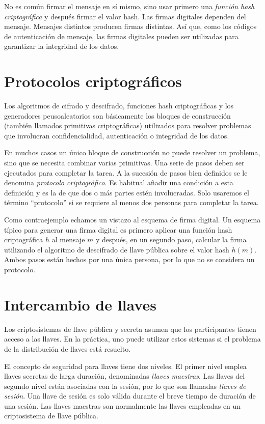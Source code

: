 \documentclass[12pt]{book}
\theoremstyle{definition}
\begin{document}
No es común firmar el mensaje en sí mismo, sino usar primero una \textit{función hash criptográfica} y después firmar el valor hash. Las firmas digitales dependen del mensaje. Mensajes distintos producen firmas distintas. Así que, como los códigos de autenticación de mensaje, las firmas digitales pueden ser utilizadas para garantizar la integridad de los datos.


\section{Protocolos criptográficos}

Los algoritmos de cifrado y descifrado, funciones hash criptográficas y los generadores peusoaleatorios son básicamente los bloques de construcción (también llamados primitivas criptográficas) utilizados para resolver problemas que involucran confidencialidad, autenticación o integridad de los datos.

En muchos casos un único bloque de construcción no puede resolver un problema, sino que se necesita combinar varias primitivas. Una serie de pasos deben ser ejecutados para completar la tarea. A la sucesión de pasos bien definidos se le denomina \textit{protocolo criptográfico}. Es habitual añadir una condición a esta definición y es la de que dos o más partes estén involucradas. Solo usaremos el término ``protocolo'' si se requiere al menos dos personas para completar la tarea.

Como contraejemplo echamos un vistazo al esquema de firma digital. Un esquema típico para generar una firma digital es primero aplicar una función hash criptográfica $h$ al mensaje $m$ y después, en un segundo paso, calcular la firma utilizando el algoritmo de descifrado de llave pública sobre el valor hash $h(m)$. Ambos pasos están hechos por una única persona, por lo que no se considera un protocolo.

\section{Intercambio de llaves}
Los criptosistemas de llave pública y secreta asumen que los participantes tienen acceso a las llaves. En la práctica, uno puede utilizar estos sistemas si el problema de la distribución de llaves está resuelto.

El concepto de seguridad para llaves tiene dos niveles. El primer nivel emplea llaves secretas de larga duración, denominadas \textit{llaves maestras}. Las llaves del segundo nivel están asociadas con la sesión, por lo que son llamadas \textit{llaves de sesión}. Una llave de sesión es solo válida durante el breve tiempo de duración de una sesión. Las llaves maestras son normalmente las llaves empleadas en un criptosistema de llave pública.
\end{document}
